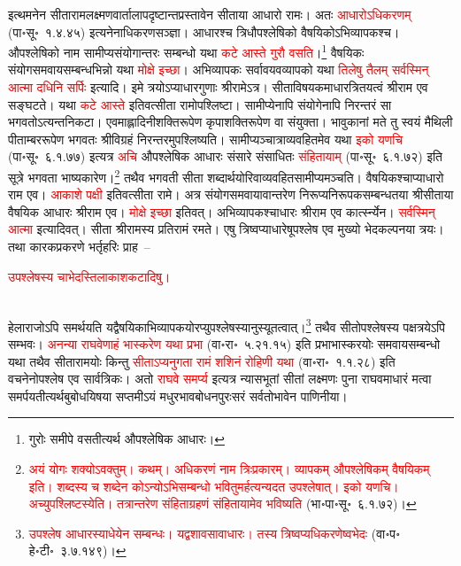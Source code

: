 \begin{sloppypar}\justifying\noindent इत्थमनेन सीता\-राम\-लक्ष्मण\-वार्तालाप\-दृष्टान्त\-प्रस्तावेन सीताया आधारो रामः। अतः \textcolor{red}{आधारोऽधिकरणम्‌} (पा॰सू॰~१.४.४५) इत्यनेनाधिकरण\-सञ्ज्ञा। आधारश्च त्रिधौपश्लेषिको वैषयिकोऽभिव्यापकश्च। औपश्लेषिको नाम सामीप्य\-संयोगान्तरः सम्बन्धो यथा \textcolor{red}{कटे आस्ते} \textcolor{red}{गुरौ वसति}।\footnote{गुरोः समीपे वसतीत्यर्थ औपश्लेषिक आधारः।} वैषयिकः संयोग\-समवाय\-सम्बन्ध\-भिन्नो यथा \textcolor{red}{मोक्षे इच्छा}। अभिव्यापकः सर्वावयव\-व्यापको यथा \textcolor{red}{तिलेषु तैलम्‌} \textcolor{red}{सर्वस्मिन् आत्मा} \textcolor{red}{दधिनि सर्पिः} इत्यादि। इमे त्रयोऽप्याधार\-गुणाः श्रीरामेऽत्र। सीता\-विषयकमाधार\-त्रितयत्वं श्रीराम एव सङ्घटते। यथा \textcolor{red}{कटे आस्ते} इतिवत्सीता रामोपश्लिष्टा। सामीप्येनापि संयोगेनापि निरन्तरं सा भगवतोऽत्यन्त\-निकटा। एवमाह्लादिनी\-शक्ति\-रूपेण कृपा\-शक्ति\-रूपेण वा संयुक्ता। भावुकानां मते तु स्वयं मैथिली पीताम्बर\-रूपेण भगवतः श्रीविग्रहं निरन्तरमुपश्लिष्यति। सामीप्यञ्चात्राव्यवहितमेव यथा \textcolor{red}{इको यणचि} (पा॰सू॰~६.१.७७) इत्यत्र \textcolor{red}{अचि} औपश्लेषिक आधारः संसारे संसाधितः \textcolor{red}{संहितायाम्‌} (पा॰सू॰~६.१.७२) इति सूत्रे भगवता भाष्य\-कारेण।\footnote{\textcolor{red}{अयं योगः शक्योऽवक्तुम्। कथम्। अधिकरणं नाम त्रिःप्रकारम्। व्यापकम् औपश्लेषिकम् वैषयिकम् इति। शब्दस्य च शब्देन कोऽन्योऽभिसम्बन्धो भवितुमर्हत्यन्यदत उपश्लेषात्। इको यणचि। अच्युपश्लिष्टस्येति। तत्रान्तरेण संहिताग्रहणं संहितायामेव भविष्यति} (भा॰पा॰सू॰~६.१.७२)।} तथैव भगवती सीता शब्दार्थयोरिवाव्यवहित\-सामीप्यमञ्चति। वैषयिकश्चाप्याधारो राम एव। \textcolor{red}{आकाशे पक्षी} इतिवत्सीता रामे। अत्र 
संयोग\-समवायावान्तरेण निरूप्य\-निरूपक\-सम्बन्धतया श्रीसीताया वैषयिक आधारः श्रीराम एव। \textcolor{red}{मोक्षे इच्छा} इतिवत्। अभिव्यापकश्चाधारः श्रीराम एव कार्त्स्न्येन। \textcolor{red}{सर्वस्मिन् आत्मा} इत्यादिवत्।
सीता श्रीरामस्य प्रतिरामं रमते। एषु त्रिष्वप्याधारेषूपश्लेष एव मुख्यो भेद\-कल्पनया त्रयः। तथा कारक\-प्रकरणे भर्तृहरिः प्राह~–\end{sloppypar}
\centering\textcolor{red}{उपश्लेषस्य चाभेदस्तिलाकाशकटादिषु।}\nopagebreak\\
\\
\begin{sloppypar}\justifying\noindent हेलाराजोऽपि समर्थयति यद्वैषयिकाभि\-व्यापकयोरप्युप\-श्लेषस्यानुस्यूतत्वात्।\footnote{\textcolor{red}{उपश्लेष आधारस्याधेयेन सम्बन्धः। यद्वशावसावाधारः। तस्य त्रिष्वप्यधिकरणेष्वभेदः} (वा॰प॰ हे॰टी॰~३.७.१४९)।} तथैव सीतोपश्लेषस्य पक्षत्रयेऽपि सम्भवः। \textcolor{red}{अनन्या राघवेणाहं भास्करेण यथा प्रभा} (वा॰रा॰~५.२१.१५) इति प्रभा\-भास्करयोः समवाय\-सम्बन्धो यथा तथैव सीता\-रामयोः किन्तु \textcolor{red}{सीताऽप्यनुगता रामं शशिनं रोहिणी यथा} (वा॰रा॰~१.१.२८) इति वचनेनोपश्लेष एव सार्वत्रिकः। अतो \textcolor{red}{राघवे समर्प्य} इत्यत्र न्यास\-भूतां सीतां लक्ष्मणः पुना राघवमाधारं मत्वा समर्पयतीत्यर्थ\-बुबोधयिषया सप्तमीऽयं मधुर\-भाव\-बोधन\-पुरः\-सरं सर्वतो\-भावेन पाणिनीया।\end{sloppypar}
